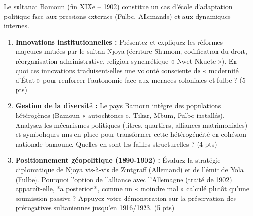 \documentclass[11pt]{article}
\begin{document}
\begin{exercice}
\label{exo:bamoun}
Le sultanat Bamoun (fin XIXe – 1902) constitue un cas d'école d'adaptation politique face aux pressions externes (Fulbe, Allemands) et aux dynamiques internes.

\begin{enumerate}
    \item \textbf{Innovations institutionnelles :} Présentez et expliquez les réformes majeures initiées par le sultan Njoya (écriture Shümom, codification du droit, réorganisation administrative, religion synchrétique « Nwet Nkuete »). En quoi ces innovations traduisent-elles une volonté consciente de « modernité d'État » pour renforcer l'autonomie face aux menaces coloniales et fulbe ? \hfill (5 pts)
    
    \item \textbf{Gestion de la diversité :} Le pays Bamoun intègre des populations hétérogènes (Bamoun « autochtones », Tikar, Mbum, Fulbe installés). Analysez les mécanismes politiques (titres, quartiers, alliances matrimoniales) et symboliques mis en place pour transformer cette hétérogénéité en cohésion nationale bamoune. Quelles en sont les failles structurelles ? \hfill (4 pts)
    
    \item \textbf{Positionnement géopolitique (1890-1902) :} Évaluez la stratégie diplomatique de Njoya vis-à-vis de Zintgraff (Allemand) et de l'émir de Yola (Fulbe). Pourquoi l'option de l'alliance avec l'Allemagne (traité de 1902) apparaît-elle, *a posteriori*, comme un « moindre mal » calculé plutôt qu'une soumission passive ? Appuyez votre démonstration sur la préservation des prérogatives sultaniennes jusqu'en 1916/1923. \hfill (5 pts)
\end{enumerate}
\end{exercice}
\end{document}
